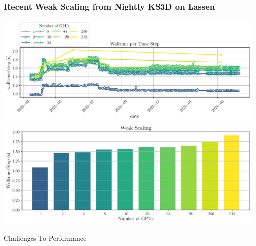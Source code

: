 \begin{frame}\frametitle{Recent Weak Scaling from Nightly KS3D on Lassen}
\begin{center}
  \includegraphics[width=.6\textwidth]{Figures/mtc/NightlyWeak.pdf}
  \includegraphics[width=.6\textwidth]{Figures/mtc/weak_scaling_NightlyWeak.pdf}
\end{center}
\end{frame}

\begin{frame}
    \centering
    \Large
    Challenges To Performance
\end{frame}

